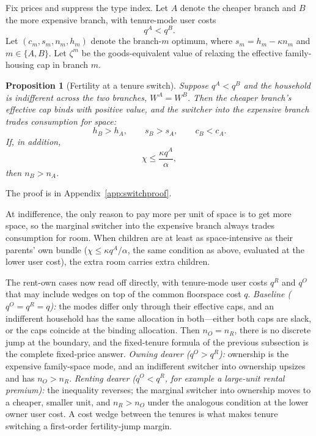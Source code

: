 \documentclass[11pt]{article}
\newtheorem{proposition}{Proposition}
\newcommand{\1}{\mathbf 1}
\begin{document}
Fix prices and suppress the type index. Let $A$ denote the cheaper branch and $B$ the more expensive branch, with tenure-mode user costs
\[
q^A<q^B.
\]
Let $(c_m,s_m,n_m,h_m)$ denote the branch-$m$ optimum, where $s_m=h_m-\kappa n_m$ and $m\in\{A,B\}$. Let $\zeta^m$ be the goods-equivalent value of relaxing the effective family-housing cap in branch $m$.

\begin{proposition}[Fertility at a tenure switch]
\label{prop:tenure_switch_fertility}
Suppose $q^A<q^B$ and the household is indifferent across the two branches, $W^A=W^B$. Then the cheaper branch's effective cap binds with positive value, and the switcher into the expensive branch trades consumption for space:
\[
h_B>h_A,
\qquad
s_B>s_A,
\qquad
c_B<c_A.
\]
If, in addition,
\[
\chi\le \frac{\kappa q^A}{\alpha},
\]
then $n_B>n_A$.
\end{proposition}

The proof is in Appendix~\ref{app:switchproof}.

At indifference, the only reason to pay more per unit of space is to get more space, so the marginal switcher into the expensive branch always trades consumption for room. When children are at least as space-intensive as their parents' own bundle ($\chi\le\kappa q^A/\alpha$, the same condition as above, evaluated at the lower user cost), the extra room carries extra children.

The rent-own cases now read off directly, with tenure-mode user costs $q^R$ and $q^O$ that may include wedges on top of the common floorspace cost $q$. \emph{Baseline ($q^O=q^R=q$):} the modes differ only through their effective caps, and an indifferent household has the same allocation in both---either both caps are slack, or the caps coincide at the binding allocation. Then $n_O=n_R$, there is no discrete jump at the boundary, and the fixed-tenure formula of the previous subsection is the complete fixed-price answer. \emph{Owning dearer ($q^O>q^R$):} ownership is the expensive family-space mode, and an indifferent switcher into ownership upsizes and has $n_O>n_R$. \emph{Renting dearer ($q^O<q^R$, for example a large-unit rental premium):} the inequality reverses; the marginal switcher into ownership moves to a cheaper, smaller unit, and $n_R>n_O$ under the analogous condition at the lower owner user cost. A cost wedge between the tenures is what makes tenure switching a first-order fertility-jump margin.
\end{document}

